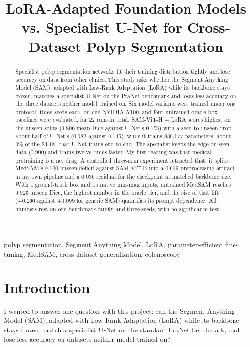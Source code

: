 \documentclass[conference]{IEEEtran}
\begin{document}
\title{LoRA-Adapted Foundation Models vs. Specialist U-Net for Cross-Dataset Polyp Segmentation}

\author{
}

\maketitle

\begin{abstract}
Specialist polyp segmentation networks fit their training distribution tightly and lose accuracy on data from other clinics. This study asks whether the Segment Anything Model (SAM), adapted with Low-Rank Adaptation (LoRA) while its backbone stays frozen, matches a specialist U-Net on the PraNet benchmark and loses less accuracy on the three datasets neither model trained on. Six model variants were trained under one protocol, three seeds each, on one NVIDIA A100, and four untrained oracle-box baselines were evaluated, for 22 runs in total. SAM-ViT-H + LoRA scores highest on the unseen splits (0.806 mean Dice against U-Net's 0.755) with a seen-to-unseen drop about half of U-Net's (0.082 against 0.145), while it trains 830,177 parameters, about 3\% of the 24.4M that U-Net trains end-to-end. The specialist keeps the edge on seen data (0.900) and trains twelve times faster. My first reading was that medical pretraining is a net drag. A controlled three-arm experiment retracted that: it splits MedSAM's 0.100 unseen deficit against SAM-ViT-B into a 0.069 preprocessing artifact in my own pipeline and a 0.036 residual for the checkpoint at matched backbone size. With a ground-truth box and its native min-max inputs, untrained MedSAM reaches 0.925 unseen Dice, the highest number in the oracle tier, and the size of that lift (+0.200 against +0.099 for generic SAM) quantifies its prompt dependence. All numbers rest on one benchmark family and three seeds, with no significance test.
\end{abstract}

\begin{IEEEkeywords}
polyp segmentation, Segment Anything Model, LoRA, parameter-efficient fine-tuning, MedSAM, cross-dataset generalization, colonoscopy
\end{IEEEkeywords}
\section{Introduction}\label{sec:1}
I wanted to answer one question with this project: can the Segment Anything Model (SAM), adapted with Low-Rank Adaptation (LoRA) while its backbone stays frozen, match a specialist U-Net on the standard PraNet benchmark, and lose less accuracy on datasets neither model trained on?
\end{document}
